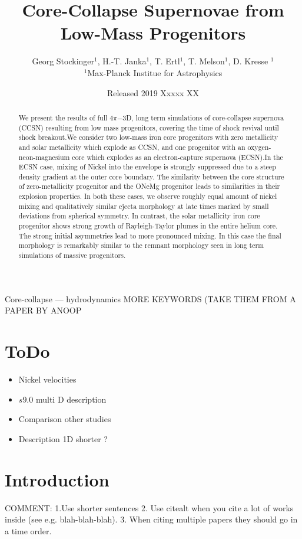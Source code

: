 \documentclass[fleqn,usenatbib]{mnras}
\title{Core-Collapse Supernovae from Low-Mass Progenitors}
\author[G. Stockinger et. al]{Georg Stockinger$^1$, H.-T. Janka$^1$, T. Ertl$^1$, T. Melson$^1$, D. Kresse $^1$\\
$^1$Max-Planck Institue for Astrophysics}
\date{Released 2019 Xxxxx XX}
\newcommand{\NY}[2]{{\color{blue}\sout{#1}#2}}
\begin{document}
\label{firstpage}
\pagerange{\pageref{firstpage}--\pageref{lastpage}}
\maketitle
{}

\begin{abstract}
We present the results of full $4\pi\mathord{-}$3D, long term simulations of core-collapse supernova (CCSN) resulting from low mass progenitors, covering the time of shock revival until shock breakout.We consider two low-mass iron core progenitors with zero metallicity and solar metallicity which explode as CCSN, and one progenitor with an oxygen-neon-magnesium core which explodes as an electron-capture supernova (ECSN).In the ECSN case, mixing of Nickel into the envelope is strongly suppressed due to a steep density gradient at the outer core boundary. The similarity between the core structure of zero-metallicity progenitor and the ONeMg progenitor leads to similarities in their explosion properties. In both these cases, we observe roughly equal amount of nickel mixing and qualitatively similar ejecta morphology at late times marked by small deviations from spherical symmetry. In contrast, the solar metallicity iron core progenitor shows strong growth of Rayleigh-Taylor plumes in the entire helium core. The strong initial asymmetries lead to more pronounced mixing. In this case the final morphology is remarkably similar to the remnant morphology seen in long term simulations of massive progenitors.
\end{abstract}

\begin{keywords}
Core-collapse --- hydrodynamics
\NY{}{MORE KEYWORDS (TAKE THEM FROM A PAPER BY ANOOP}
\end{keywords}
\noindent

\section{ToDo}
\begin{itemize}
    \item Nickel velocities
    \item $s9.0$ multi D description
    \item Comparison other studies
    \item Description 1D shorter ?
\end{itemize}

\section{Introduction}
\NY{}{COMMENT: 1.Use shorter sentences 2. Use citealt when you cite a lot of works inside (see e.g. blah-blah-blah). 3. When citing multiple papers they should go in a time order.}
\end{document}
